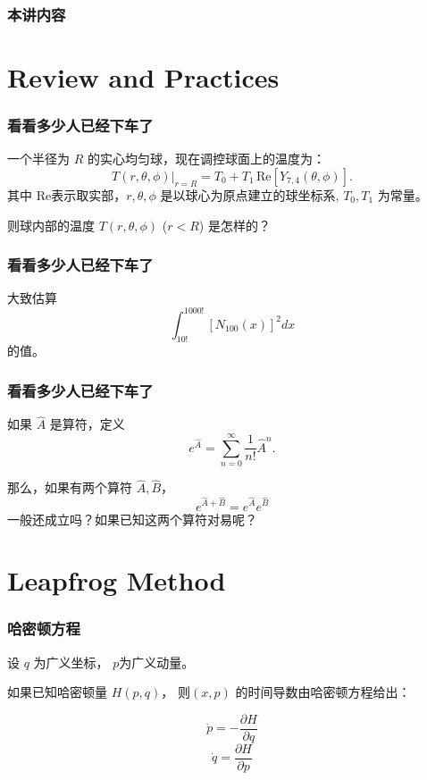 \documentclass[CJK]{beamer}
\date{}
\begin{document}
  \bch
{}

\begin{frame}
\frametitle{本讲内容}
\tableofcontents
\end{frame}

\section{Review and Practices}

\begin{frame}
  \frametitle{看看多少人已经下车了}

  
  一个半径为 $R$ 的实心均匀球，现在调控球面上的温度为：
$$T(r,\theta,\phi)|_{r=R} = T_0+T_1\,\mathrm{Re}\left[Y_{7,4}(\theta,\phi)\right].$$
其中 $\mathrm{Re}$表示取实部，$r,\theta,\phi$ 是以球心为原点建立的球坐标系, $T_0,T_1$ 为常量。

则球内部的温度 $T(r, \theta,\phi)$ ($r < R$) 是怎样的？
\end{frame}



\begin{frame}
  \frametitle{看看多少人已经下车了}

  大致估算
  $$\int_{10!}^{1000!}\left[N_{100}(x)\right]^2 dx $$
  的值。
  
\end{frame}

\begin{frame}
  \frametitle{看看多少人已经下车了}
  
  如果 $\hat{A}$ 是算符，定义
  $$ e^{\hat{A}} = \sum_{n=0}^\infty \frac{1}{n!}\hat{A}^n.$$

  那么，如果有两个算符 $\hat{A},\hat{B}$，
  $$ e^{\hat{A}+\hat{B}} =  e^{\hat{A}}  e^{\hat{B}}$$
  一般还成立吗？如果已知这两个算符对易呢？
  
  
\end{frame}


\section{Leapfrog Method}

\begin{frame}
  \frametitle{哈密顿方程}
  设 $q$ 为广义坐标， $p$为广义动量。
  
  如果已知哈密顿量 $H(p, q)$， 则$(x,p)$ 的时间导数由哈密顿方程给出：

  $$\dot p = -\frac{\partial H}{\partial q}$$    
  $$\dot q = \frac{\partial H}{\partial p}$$

\end{frame}
\end{document}
